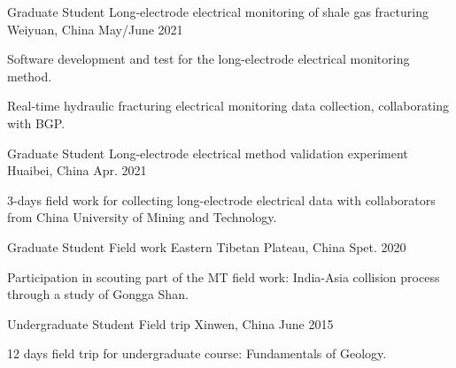 \begin{cventries}
  \cventry
    {Graduate Student} %
    {Long-electrode electrical monitoring of shale gas fracturing} %
    {Weiyuan, China} %
    {May/June 2021} %
    {
      \begin{cvitems} %
        \item {Software development and test for the long-electrode electrical monitoring method.}
        \item {Real-time hydraulic fracturing electrical monitoring data collection, collaborating with BGP.}
      \end{cvitems}
    }

  \cventry
    {Graduate Student} %
    {Long-electrode electrical method validation experiment} %
    {Huaibei, China} %
    {Apr. 2021} %
    {
      \begin{cvitems} %
        \item {3-days field work for collecting long-electrode electrical data with collaborators from China University of Mining and Technology.}
      \end{cvitems}
    }

  \cventry
    {Graduate Student} %
    {Field work} %
    {Eastern Tibetan Plateau, China} %
    {Spet. 2020} %
    {
      \begin{cvitems} %
        \item {Participation in scouting part of the MT field work: India-Asia collision process through a study of Gongga Shan.}
      \end{cvitems}
    }


  \cventry
    {Undergraduate Student} %
    {Field trip} %
    {Xinwen, China} %
    {June 2015} %
    {
      \begin{cvitems} %
        \item {12 days field trip for undergraduate course: Fundamentals of Geology.}
      \end{cvitems}
    }

\end{cventries}

